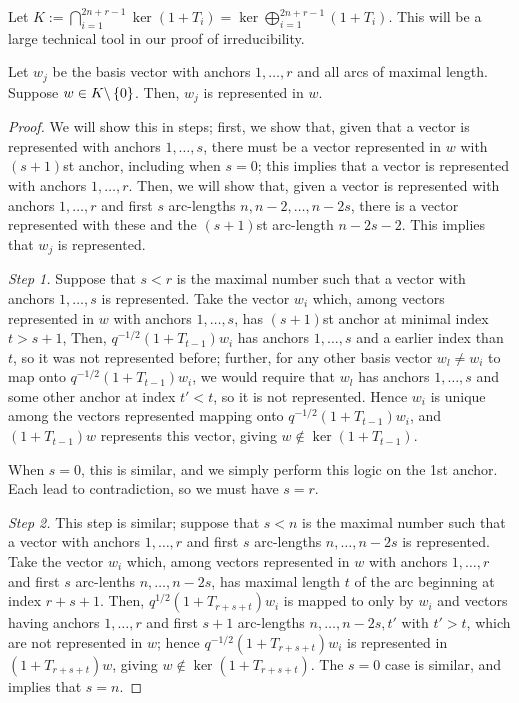 \documentclass{amsart}
\begin{document}
Let $K := \bigcap_{i=1}^{2n+r-1} \ker (1 + T_i) = \ker \bigoplus_{i = 1}^{2n + r - 1} (1 + T_i)$.
This will be a large technical tool in our proof of irreducibility.
\begin{lemma}\label{Represented}
  Let $w_j$ be the basis vector with anchors $1,\dots,r$ and all arcs of maximal length.
  Suppose $w \in K \backslash \left\{ 0 \right\}$.
  Then, $w_j$ is represented in $w$.
\end{lemma}
\begin{proof}
  We will show this in steps; first, we show that, given that a vector is represented with anchors $1,\dots,s$, there must be a vector represented in $w$ with $(s+1)$st anchor, including when $s = 0$;
  this implies that a vector is represented with anchors $1,\dots,r$.
  Then, we will show that, given a vector is represented with anchors $1,\dots,r$ and first $s$ arc-lengths $n,n-2,\dots,n-2s$, there is a vector represented with these and the $(s+1)$st arc-length $n-2s-2$.
  This implies that $w_j$ is represented.
  
  \def\lemsep{7pt}
  \vspace{\lemsep}
  \textit{Step 1.}
  Suppose that $s < r$ is the maximal number such that a vector with anchors $1,\dots,s$ is represented.
  Take the vector $w_i$ which, among vectors represented in $w$ with anchors $1,\dots,s$, has $(s+1)$st anchor at minimal index $t > s + 1$,
  Then, $q^{-1/2}(1 + T_{t-1})w_i$ has anchors $1,\dots,s$ and a earlier index than $t$, so it was not represented before;
  further, for any other basis vector $w_l \neq w_i$ to map onto $q^{-1/2}(1 + T_{t-1})w_i$, we would require that $w_l$ has anchors $1,\dots,s$ and some other anchor at index $t' < t$, so it is not represented.
  Hence $w_i$ is unique among the vectors represented mapping onto $q^{-1/2}(1 + T_{t-1})w_i$, and $(1 + T_{t-1})w$ represents this vector, giving $w \notin \ker (1 + T_{t-1})$.
 
  When $s = 0$, this is similar, and we simply perform this logic on the 1st anchor.
  Each lead to contradiction, so we must have $s = r$. 

  \vspace{\lemsep}
  \textit{Step 2.}
  This step is similar;
  suppose that $s < n$ is the maximal number such that a vector with anchors $1,\dots,r$ and first $s$ arc-lengths $n,\dots,n-2s$ is represented.
  Take the vector $w_i$ which, among vectors represented in $w$ with anchors $1,\dots,r$ and first $s$ arc-lenths $n,\dots,n-2s$, has maximal length $t$ of the arc beginning at index $r + s + 1$.
  Then, $q^{1/2}(1 + T_{r + s + t})w_i$ is mapped to only by $w_i$ and vectors having anchors $1,\dots,r$ and first $s+1$ arc-lengths $n,\dots,n-2s,t'$ with $t' > t$, which are not represented in $w$;
  hence $q^{-1/2}(1 + T_{r + s + t})w_i$ is represented in $(1 + T_{r+s+t})w$, giving $w \notin \ker (1 + T_{r + s + t})$.
  The $s = 0$ case is similar, and implies that $s = n$.
\end{proof}
\end{document}

